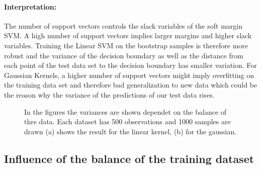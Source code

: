 \documentclass[a4paper]{article}
\begin{document}
\paragraph{Interpretation:}
The number of support vectors controls the slack variables of the soft margin SVM. A high number of support vectors implies larger margins and higher slack variables. Training the Linear SVM on the bootstrap samples is therefore more robust and the variance of the decision boundary as well as the distance from each point of the test data set to the decision boundary has smaller variation.
For Gaussian Kernels, a higher number of support vectors might imply overfitting on the training data set and therefore bad generalization to new data which could be the reason why the variance of the predictions of our test data rises.

\begin{figure}[!htb]
\begin{center}

\caption{In the figures the variances are shown dependet on the balance of thre data. Each dataset has 500 observations and 1000 samples are drawn (a) shows the result for the linear kernel, (b) for the gaussian.}
\label{fig5}
\end{center}
\end{figure}


\subsection{Influence of the balance of the training dataset}
\end{document}
